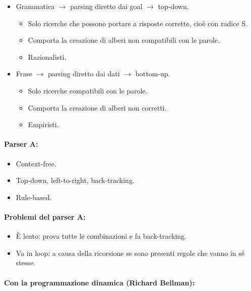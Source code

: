 \begin{itemize}
  \item Grammatica $\rightarrow$ parsing diretto dai goal $\rightarrow$ top-down. 
    \begin{itemize}
      \item Solo ricerche che possono portare a risposte corrette, cioè con
radice S. 
      \item Comporta la creazione di alberi non compatibili con le parole. 
      \item Razionalisti.
    \end{itemize}
  \item Frase $\rightarrow$ parsing diretto dai dati $\rightarrow$ bottom-up. 
    \begin{itemize}
      \item Solo ricerche compatibili con le parole. 
      \item Comporta la creazione di alberi non corretti. 
      \item Empiristi.
    \end{itemize}
\end{itemize}

\paragraph{Parser A:}

\begin{itemize}
  \item Context-free. 
  \item Top-down, left-to-right, back-tracking. 
  \item Rule-based.
\end{itemize}

\paragraph{Problemi del parser A:}

\begin{itemize}
  \item È lento: prova tutte le combinazioni e fa back-tracking. 
  \item Va in loop: a causa della ricorsione se sono presenti regole che vanno in sé stesse.
\end{itemize}


\paragraph{Con la programmazione dinamica (Richard Bellman):}

